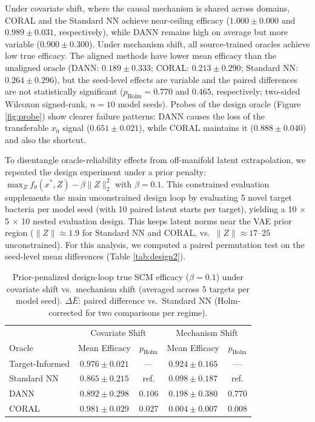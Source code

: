 \documentclass{article}
\begin{document}
Under covariate shift, where the causal mechanism is shared across domains, CORAL and the Standard NN achieve near-ceiling efficacy ($1.000 \pm 0.000$ and $0.989 \pm 0.031$, respectively), while DANN remains high on average but more variable ($0.900 \pm 0.300$). Under mechanism shift, all source-trained oracles achieve low true efficacy. The aligned methods have lower mean efficacy than the unaligned oracle (DANN: $0.189 \pm 0.333$; CORAL: $0.213 \pm 0.290$; Standard NN: $0.264 \pm 0.296$), but the seed-level effects are variable and the paired differences are not statistically significant ($p_{\text{Holm}} = 0.770$ and $0.465$, respectively; two-sided Wilcoxon signed-rank, $n{=}10$ model seeds). Probes of the design oracle (Figure \ref{fig:probe}) show clearer failure patterns: DANN causes the loss of the transferable $x_0$ signal ($0.651 \pm 0.021$), while CORAL maintains it ($0.888 \pm 0.040$) and also the shortcut.

To disentangle oracle-reliability effects from off-manifold latent extrapolation, we repeated the design experiment under a prior penalty: $\max_Z f_\theta(x^*, Z) - \beta\|Z\|_2^2$ with $\beta = 0.1$. This constrained evaluation supplements the main unconstrained design loop by evaluating 5 novel target bacteria per model seed (with 10 paired latent starts per target), yielding a 10 $\times$ 5 $\times$ 10 nested evaluation design. This keeps latent norms near the VAE prior region ($\|Z\| \approx 1.9$ for Standard NN and CORAL, vs.\ $\|Z\| \approx 17$--$25$ unconstrained). For this analysis, we computed a paired permutation test on the seed-level mean differences (Table \ref{tab:design2}).

\begin{table}[H]\footnotesize
\centering
\caption{Prior-penalized design-loop true SCM efficacy ($\beta = 0.1$) under covariate shift vs.\ mechanism shift (averaged across 5 targets per model seed). $\Delta \bar{E}$: paired difference vs.\ Standard NN (Holm-corrected for two comparisons per regime).}
\label{tab:design2}
\label{tab:constrained}
\begin{tabular}{l|cc|cc}
\toprule
 & \multicolumn{2}{c|}{Covariate Shift} & \multicolumn{2}{c}{Mechanism Shift} \\
Oracle & Mean Efficacy & $p_{\text{Holm}}$ & Mean Efficacy & $p_{\text{Holm}}$ \\
\midrule
Target-Informed & $0.976 \pm 0.021$ & --- & $0.924 \pm 0.165$ & --- \\
Standard NN & $0.865 \pm 0.215$ & ref. & $0.098 \pm 0.187$ & ref. \\
DANN & $0.892 \pm 0.298$ & $0.106$ & $0.198 \pm 0.380$ & $0.770$ \\
CORAL & $0.981 \pm 0.029$ & $\mathbf{0.027}$ & $0.004 \pm 0.007$ & $\mathbf{0.008}$ \\
\bottomrule
\end{tabular}
\end{table}
\end{document}
